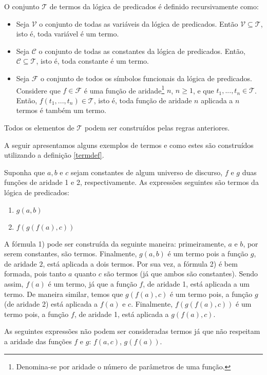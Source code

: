 \begin{Definition}\label{termdef}
O conjunto $\mathcal{T}$ de termos da lógica de predicados é definido
recursivamente como:
\begin{itemize}
  \item Seja $\mathcal{V}$ o conjunto de todas as variáveis da lógica
    de predicados. Então $\mathcal{V} \subseteq \mathcal{T}$, isto é,
    toda variável é um termo.
  \item Seja $\mathcal{C}$ o conjunto de todas as constantes da lógica
    de predicados. Então, $\mathcal{C}\subseteq\mathcal{T}$, isto é,
    toda constante é um termo.
  \item Seja $\mathcal{F}$ o conjunto de todos os símbolos funcionais
    da lógica de predicados. Considere que $f\in\mathcal{F}$ é uma
    função de aridade\footnote{Denomina-se por aridade o número de
      parâmetros de uma função.} $n$, $n\geq 1$, e que $t_1,...,t_n \in
    \mathcal{T}$. Então, $f(t_1,...,t_n)\in\mathcal{T}$, isto é, toda
    função de aridade $n$ aplicada a $n$ termos é também um termo.
\end{itemize}
Todos os elementos de $\mathcal{T}$ podem ser construídos pelas regras anteriores.
\end{Definition}
A seguir apresentamos alguns exemplos de termos e como estes são
construídos utilizando a definição \ref{termdef}.
\begin{Example}
Suponha que $a,b$ e $c$ sejam constantes de algum universo de
discurso, $f$ e $g$ duas funções de aridade 1 e 2, respectivamente. As
expressões seguintes são termos da lógica de predicados:
\begin{enumerate}
  \item $g(a,b)$
  \item $f(g(f(a),c))$
\end{enumerate}

A fórmula 1) pode ser construída da seguinte maneira: primeiramente,
$a$ e $b$, por serem constantes, são termos. Finalmente, $g(a,b)$ é um
termo pois a função $g$, de aridade $2$, está aplicada a dois termos.
Por sua vez, a fórmula 2) é bem formada, pois tanto $a$ quanto $c$ são
termos (já que ambos são constantes). Sendo assim, $f(a)$ é um termo,
já que a função $f$, de aridade 1, está aplicada a um termo. De
maneira similar, temos que $g(f(a),c)$ é um termo pois, a função $g$
(de aridade 2) está aplicada a $f(a)$ e $c$. Finalmente,
$f(g(f(a),c))$ é um termo pois, a função $f$, de aridade 1, está
aplicada a $g(f(a),c)$.

As seguintes expressões não podem ser consideradas termos já que não
respeitam a aridade das funções $f$ e $g$: $f(a,c)$, $g(f(a))$.
\end{Example}

